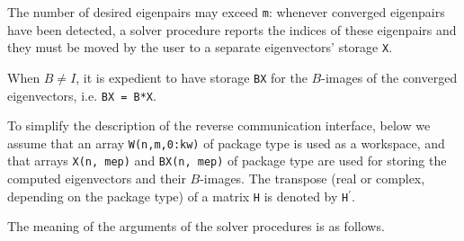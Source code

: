 The number of desired eigenpairs may exceed {\tt m}:
whenever converged eigenpairs have been detected,
a solver procedure reports the indices of these eigenpairs
and they must be moved by the user
to a separate eigenvectors' storage {\tt X}.

When $B \ne I$,
it is expedient to 
have %
storage {\tt BX}
for the $B$-images of the converged eigenvectors,
i.e. {\tt BX = B*X}.

To simplify the description of the
reverse communication interface,
below we assume that an array
{\tt W(n,m,0:kw)} of package type
is used as a workspace,
and that arrays {\tt X(n, mep)} and {\tt BX(n, mep)} of package type
are used for storing the computed eigenvectors
and their $B$-images.
The transpose (real or complex, depending on the package type)
of a matrix {\tt H} 
is denoted by {\tt H}$^\prime$.

\medskip
The meaning of the arguments of the solver procedures is as follows.

